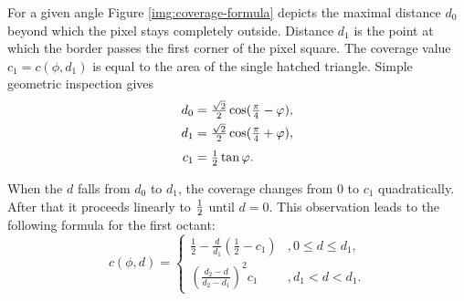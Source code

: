 For a given angle Figure \ref{img:coverage-formula} depicts the maximal distance $d_0$ beyond which the pixel stays completely outside. Distance $d_1$ is the point at which the border passes the first corner of the pixel square. The coverage value $c_1 = c(\phi, d_1)$ is equal to the area of the single hatched triangle. Simple geometric inspection gives
\begin{equation}\begin{split}
	d_0 &= \tfrac{\sqrt{2}}{2}\cos(\tfrac{\pi}{4} - \varphi), \\
    d_1 &= \tfrac{\sqrt{2}}{2}\cos(\tfrac{\pi}{4} + \varphi), \\[3pt]
    c_1 &= \tfrac{1}{2} \tan\varphi.
\end{split}\end{equation}

When the $d$ falls from $d_0$ to $d_1$, the coverage changes from 0 to $c_1$ quadratically. After that it proceeds linearly to $\tfrac{1}{2}$ until $d = 0$. This observation leads to the following formula for the first octant:
\begin{equation}
	c(\phi, d) = \begin{cases}
		\frac{1}{2} - \frac{d}{d_1}\left(\frac{1}{2} - c_1\right)
        	&, 0 \leq d \leq d_1, \\[6pt]
        \left(\frac{d_2 - d}{d_2 - d_1}\right)^2 c_1
        	&, d_1 < d < d_1.
	\end{cases}
\end{equation}